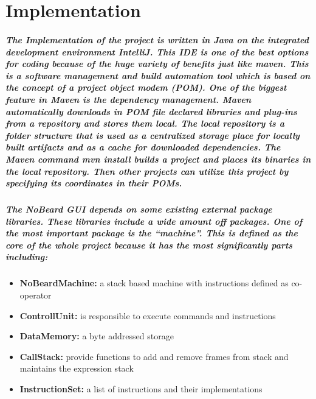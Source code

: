 \chapter{Implementation}
\paragraph{The Implementation of the project is written in Java on the integrated development environment IntelliJ. This IDE is one of the best options for coding because of the huge variety of benefits just like maven. This is a software management and build automation tool which is based on the concept of a project object modem (POM). One of the biggest feature in Maven is the dependency management. Maven automatically downloads in POM file declared libraries and plug-ins from a repository and stores them local. The local repository is a folder structure that is used as a centralized storage place for locally built artifacts and as a cache for downloaded dependencies. The Maven command mvn install builds a project and places its binaries in the local repository. Then other projects can utilize this project by specifying its coordinates in their POMs.}
\paragraph{The NoBeard GUI depends on some existing external package libraries. These libraries include a wide amount off packages. One of the most important package is the “machine”. This is defined as the core of the whole project because it has the most significantly parts including:}
\begin{itemize}
\item \textbf{NoBeardMachine: }a stack based machine with instructions defined as co-operator
\item \textbf{ControllUnit: }is responsible to execute commands and instructions
\item \textbf{DataMemory: }a byte addressed storage
\item \textbf{CallStack: }provide functions to add and remove frames from stack and maintains the expression stack
\item \textbf{InstructionSet: }a list of instructions and their implementations
\end{itemize}
